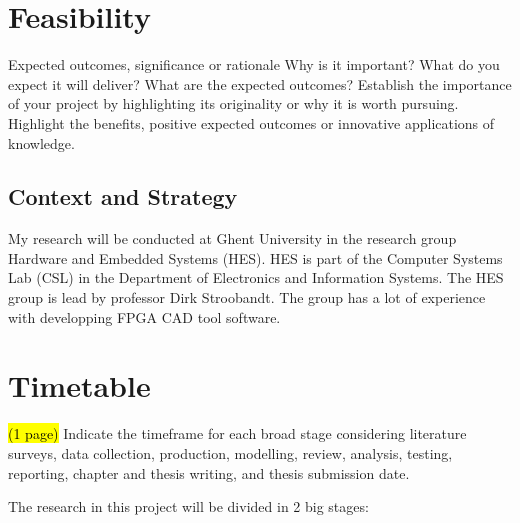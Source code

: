 \documentclass[a4paper,oneside,12pt]{article}
\begin{document}
\section{Feasibility}
Expected outcomes, significance or rationale
Why is it important? 
What do you expect it will deliver? 
What are the expected outcomes? 
Establish the importance of your project by highlighting its originality or why it is worth pursuing. Highlight the benefits, positive expected outcomes or innovative applications of knowledge.


\subsection{Context and Strategy}\label{context}
My research will be conducted at Ghent University in the research group Hardware and Embedded Systems (HES). HES is part of the Computer Systems Lab (CSL) in the Department of Electronics and Information Systems. The HES group is lead by professor Dirk Stroobandt. The group has a lot of experience with developping FPGA CAD tool software.

\newpage

\section{Timetable}\label{timetable}
\hl{(1 page)}
Indicate the timeframe for each broad stage considering literature surveys, data collection, production, modelling, review, analysis,
testing, reporting, chapter and thesis writing, and thesis submission date.

The research in this project will be divided in 2 big stages:
\end{document}
